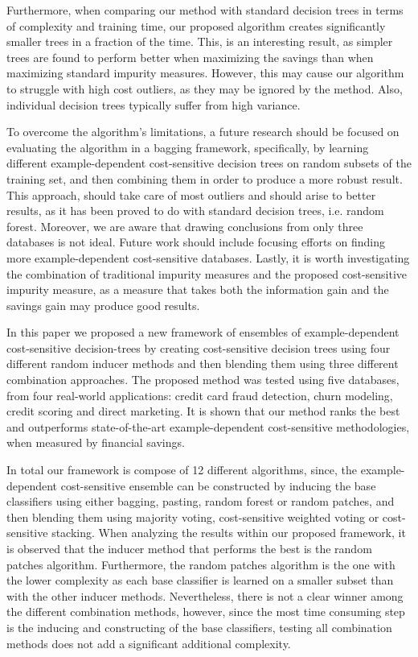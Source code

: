 Furthermore, when comparing our method with standard decision trees in terms of complexity 
and training time, our proposed algorithm creates significantly smaller trees in a fraction of the 
time. This, is an interesting result, as simpler trees are found to perform better when maximizing 
the savings than when maximizing standard impurity measures.
However, this may cause our algorithm to struggle with high cost outliers, as they may be ignored 
by the method. Also, individual decision trees typically suffer from high variance.

To overcome the algorithm's limitations, a future research should be focused on evaluating the 
algorithm in a bagging framework, specifically, by learning different example-dependent 
cost-sensitive decision trees on random subsets of the training set, and then combining them in 
order to produce a more robust result. This approach, should take care of most outliers and should 
arise to better results, as it has been proved to do with standard decision trees, i.e. random 
forest. Moreover, we are aware that drawing conclusions from only three databases is not ideal. 
Future work should include focusing efforts on finding more example-dependent cost-sensitive 
databases. Lastly, it is worth investigating the combination of traditional impurity measures and 
the proposed cost-sensitive impurity measure, as a measure that takes both the information gain and 
the savings gain may produce good results.

  In this paper we proposed a new framework of ensembles of example-dependent cost-sensitive 
  decision-trees by creating cost-sensitive decision trees using four different 
  random inducer methods and then blending them using three different combination approaches.
  The proposed method was tested using five databases, from four real-world applications: credit 
  card fraud detection, churn modeling, credit scoring and direct marketing. It is shown that our 
  method ranks the best and outperforms state-of-the-art example-dependent cost-sensitive 
  methodologies, when measured by financial savings.
  
  In total our framework is compose of 12 different algorithms, since, the example-dependent 
  cost-sensitive ensemble can be constructed by inducing the base classifiers using either 
  bagging, pasting, random forest or random patches, and then blending them using majority voting, 
  cost-sensitive weighted voting or cost-sensitive stacking. When analyzing the results within our 
  proposed framework, it is observed that the inducer method that performs the best is the random 
  patches algorithm. Furthermore, the random patches algorithm is the one with the 
  lower complexity as each base classifier is learned on a smaller subset than with the 
  other inducer methods. Nevertheless, there is not a clear winner among the different combination  
  methods, however, since the most time consuming step is the inducing and constructing of the 
  base classifiers, testing all combination methods does not add a significant additional  
  complexity.
  
